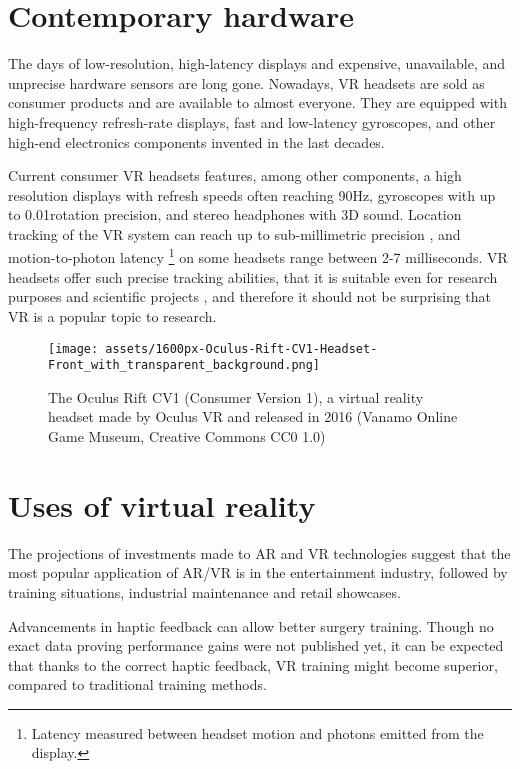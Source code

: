 \section{Contemporary hardware}
The days of low-resolution, high-latency displays and expensive, unavailable,
and unprecise hardware sensors are long gone. Nowadays, VR headsets are
sold as consumer products and are available to almost everyone. They are
equipped with high-frequency refresh-rate displays, fast and low-latency
gyroscopes, and other high-end electronics components invented in the last
decades.

Current consumer VR headsets features, among other components,
a high resolution displays with refresh speeds often reaching 90Hz, gyroscopes
with up to 0.01\degree rotation precision, and stereo headphones with 3D sound.
Location tracking of the VR system can reach up to sub-millimetric precision
\cite{vivenasa}, and motion-to-photon latency
\footnote{Latency measured between headset motion and photons emitted from the display.}
on some headsets range between 2-7 milliseconds. \cite{mtpltc} \cite{xinwiki}
VR headsets offer such precise tracking abilities, that it is suitable even
for research purposes and scientific projects \cite{vivepbsr}, and therefore
it should not be surprising that VR is a popular topic to research.


\begin{figure}[h]{}
\centering\texttt{[image: assets/1600px-Oculus-Rift-CV1-Headset-Front\_with\_transparent\_background.png]}
\caption{The Oculus Rift CV1 (Consumer Version 1), a virtual reality headset made by Oculus VR and released in 2016 
    (Vanamo Online Game Museum, Creative Commons CC0 1.0)}
\end{figure}

\section{Uses of virtual reality}
The projections of investments made to AR and VR technologies suggest
that the most popular application of AR/VR is in the entertainment industry,
followed by training situations, industrial maintenance and retail showcases.
\cite{statistavr}


Advancements in haptic feedback can allow better surgery training\cite{vhfcrmisvrt}. 
Though no exact data proving performance gains
were not published yet, it can be expected that thanks to the correct haptic
feedback, VR training might become superior, compared to traditional
training methods.\cite{vrsrgr}



